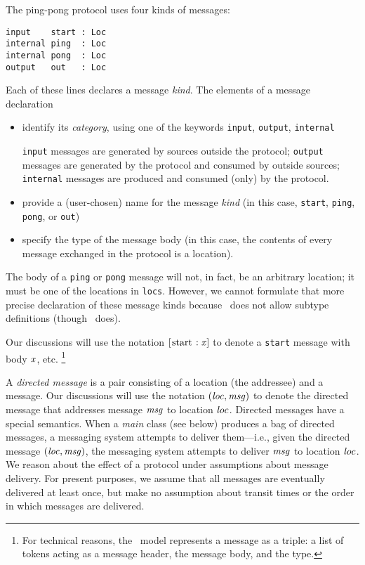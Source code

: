 \documentclass[final]{article}
\newcommand{\listinline}[1]{\text{\lstinline{#1}}}
\newcommand{\msg}[2]{\ensuremath{[\listinline{#1}:\NUPRL{#2}]}}
\begin{document}
The ping-pong protocol uses four kinds of messages:
%
%
%
\begin{emlcode}
\begin{lstlisting}
input    start : Loc
internal ping  : Loc
internal pong  : Loc
output   out   : Loc
\end{lstlisting}
\end{emlcode}
Each of these lines declares a message \emph{kind}.%
%
%
The elements of a message declaration
\begin{itemize}
\item
identify its \emph{category},%
%
%
using one of the keywords \lstinline{input}, \lstinline{output},
\lstinline{internal}

\lstinline{input} messages are generated by sources outside the
protocol; \lstinline{output} messages are generated by the protocol
and consumed by outside sources; \lstinline{internal} messages are
produced and consumed (only) by the protocol.

\item
provide a (user-chosen) name for the message \emph{kind} (in this
case, \lstinline{start}, \lstinline{ping}, \lstinline{pong}, or
\lstinline{out})

\item
specify the type of the message body (in this case, the contents of
every message exchanged in the protocol is a location).
\end{itemize}
The body of a \lstinline{ping} or \lstinline{pong} message will not,
in fact, be an arbitrary location; it must be one of the locations in
\lstinline{locs}.  However, we cannot formulate that more precise
declaration of these message kinds because \eml\ does not allow
subtype definitions (though \nuprl\ does).

Our discussions will use the notation \msg{start}{x} to denote a
\lstinline{start} message with body $\mathit{x}$, etc.
%
\footnote{For technical reasons, the \nuprl\ model represents a
  message as a triple: a list of tokens acting as a message header,
  the message body, and the type.}

A \emph{directed message}%
%
is a pair consisting of a location (the addressee) and a message.  Our
discussions will use the notation $\mathit{(loc,msg)}$ to denote the
directed message that addresses message $\mathit{msg}$ to location
$\mathit{loc}$.  Directed messages have a special semantics.  When a
\emph{main} class (see below) produces a bag of directed messages, a
messaging system attempts to deliver them---i.e., given the directed
message $\mathit{(loc,msg)}$, the messaging system attempts to deliver
$\mathit{msg}$ to location $\mathit{loc}$.  We reason about the effect
of a protocol under assumptions about message delivery.  For present
purposes, we assume that all messages are eventually delivered at
least once, but make no assumption about transit times or the order in
which messages are delivered.
\end{document}
